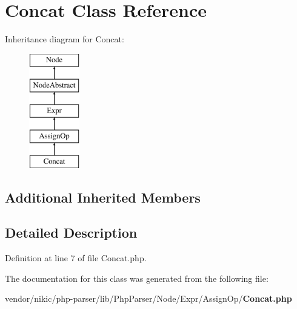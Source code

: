 \section{Concat Class Reference}
\label{class_php_parser_1_1_node_1_1_expr_1_1_assign_op_1_1_concat}
Inheritance diagram for Concat\+:\begin{figure}[H]
\begin{center}
\leavevmode
\includegraphics[height=5.000000cm]{class_php_parser_1_1_node_1_1_expr_1_1_assign_op_1_1_concat}
\end{center}
\end{figure}
\subsection*{Additional Inherited Members}


\subsection{Detailed Description}


Definition at line 7 of file Concat.\+php.



The documentation for this class was generated from the following file\+:\begin{DoxyCompactItemize}
\item 
vendor/nikic/php-\/parser/lib/\+Php\+Parser/\+Node/\+Expr/\+Assign\+Op/{\bf Concat.\+php}\end{DoxyCompactItemize}
